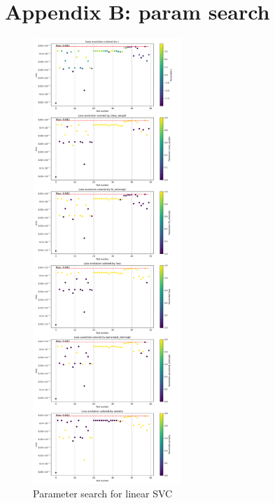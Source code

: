 \documentclass{article}
\begin{document}
    \section{Appendix B: param search}

    \begin{figure}[H]
        \centering
        \includegraphics[width=0.5\textwidth]{report_img/param_search/linear_svc}
        \caption{Parameter search for linear SVC}
        \label{fig:}
    \end{figure}
\end{document}
